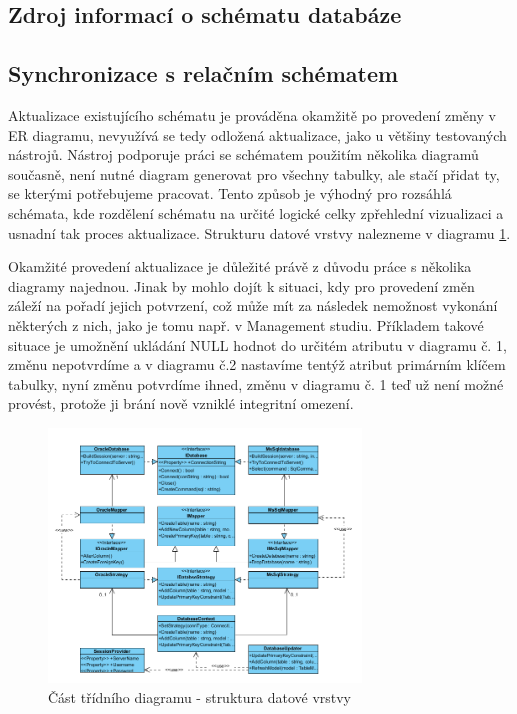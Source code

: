 \documentclass[czech,bachelor,public,dept460,male,oneside]{diploma}
\begin{document}
	\subsection{Zdroj informací o schématu databáze} \label{secDataSource}
		
	\subsection{Synchronizace s relačním schématem}
	Aktualizace existujícího schématu je prováděna okamžitě po provedení změny v ER diagramu, nevyužívá se tedy odložená aktualizace, jako u většiny testovaných nástrojů. Nástroj podporuje práci se schématem použitím několika diagramů současně, není nutné diagram generovat pro všechny tabulky, ale stačí přidat ty, se kterými potřebujeme pracovat. Tento způsob je výhodný pro rozsáhlá schémata, kde rozdělení schématu na určité logické celky zpřehlední vizualizaci a usnadní tak proces aktualizace. Strukturu datové vrstvy nalezneme v diagramu \ref{fig:classDiagSync}.
	
	Okamžité provedení aktualizace je důležité právě z důvodu práce s několika diagramy najednou. Jinak by mohlo dojít k situaci, kdy pro provedení změn záleží na pořadí jejich potvrzení, což může mít za následek nemožnost vykonání některých z nich, jako je tomu např. v Management studiu. Příkladem takové situace je umožnění ukládání NULL hodnot do určitém atributu v diagramu č. 1, změnu nepotvrdíme a v diagramu č.2 nastavíme tentýž atribut primárním klíčem tabulky, nyní změnu potvrdíme ihned, změnu v diagramu č. 1 teď už není možné provést, protože ji brání nově vzniklé integritní omezení.
	
	\begin{figure}[!h]
		\centering
		\includegraphics[width=0.74\textwidth]{Figures/EditorSync}
		\caption{Část třídního diagramu - struktura datové vrstvy}
		\label{fig:classDiagSync}
	\end{figure}
	
\end{document}
